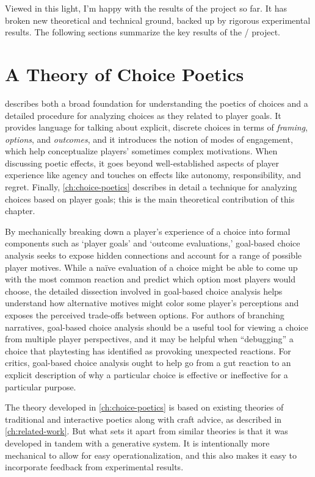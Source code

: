 Viewed in this light, I'm happy with the results of the project so far.
%
It has broken new theoretical and technical ground, backed up by rigorous experimental results.
%
The following sections summarize the key results of the \dunyazad/ project.

\section{A Theory of Choice Poetics}

 describes both a broad foundation for understanding the poetics of choices and a detailed procedure for analyzing choices as they related to player goals.
%
It provides language for talking about explicit, discrete choices in terms of \emph{framing}, \emph{options}, and \emph{outcomes}, and it introduces the notion of modes of engagement, which help conceptualize players' sometimes complex motivations.
%
When discussing poetic effects, it goes beyond well-established aspects of player experience like agency and touches on effects like autonomy, responsibility, and regret.
%
Finally, \cref{ch:choice-poetics} describes in detail a technique for analyzing choices based on player goals; this is the main theoretical contribution of this chapter.


By mechanically breaking down a player's experience of a choice into formal components such as `player goals' and `outcome evaluations,' goal-based choice analysis seeks to expose hidden connections and account for a range of possible player motives.
%
While a na\"ive evaluation of a choice might be able to come up with the most common reaction and predict which option most players would choose, the detailed dissection involved in goal-based choice analysis helps understand how alternative motives might color some player's perceptions and exposes the perceived trade-offs between options.
%
For authors of branching narratives, goal-based choice analysis should be a useful tool for viewing a choice from multiple player perspectives, and it may be helpful when ``debugging'' a choice that playtesting has identified as provoking unexpected reactions.
%
For critics, goal-based choice analysis ought to help go from a gut reaction to an explicit description of why a particular choice is effective or ineffective for a particular purpose.


The theory developed in \cref{ch:choice-poetics} is based on existing theories of traditional and interactive poetics along with craft advice, as described in \cref{ch:related-work}.
%
But what sets it apart from similar theories is that it was developed in tandem with a generative system.
%
It is intentionally more mechanical to allow for easy operationalization, and this also makes it easy to incorporate feedback from experimental results.



